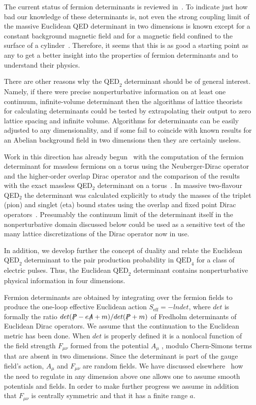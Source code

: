 \documentclass[a4paper,twocolumn,showpacs,preprintnumbers,amsmath,amssymb]{revtex4}
\newcommand{\slashletter}[1]{\ensuremath{\kern+0.1em /\kern-0.65em #1}}
\begin{document}
The current status of fermion determinants is reviewed
in~\cite{Fry02}. To indicate just how bad our knowledge of these
determinants is, not even the strong coupling limit of the massive
Euclidean QED determinant in two dimensions is known except for a
constant background magnetic field and for a magnetic field confined
to the surface of a cylinder~\cite{Fry95}.  Therefore, it seems that
this is as good a starting point as any to get a better insight into
the properties of fermion determinants and to understand their
physics.

There are other reasons why the $\text{QED}_{2}$ determinant should be
of general interest. Namely, if there were precise nonperturbative
information on at least one continuum, infinite-volume determinant
then the algorithms of lattice theorists for calculating determinants
could be tested by extrapolating their output to zero lattice spacing
and infinite volume. Algorithms for determinants can be easily
adjusted to any dimensionality, and if some fail to coincide with
known results for an Abelian background field in two dimensions then
they are certainly useless.

Work in this direction has already begun~\cite{Chiu00} with the
computation of the fermion determinant for massless fermions on a
torus using the Neuberger-Dirac operator and the higher-order overlap
Dirac operator and the comparison of the results with the exact
massless QED$_2$ determinant on a torus~\cite{Sachs92}. In massive
two-flavour QED$_2$ the determinant was calculated explicitly to study
the masses of the triplet (pion) and singlet (eta) bound states
using the overlap and fixed point Dirac
operators~\cite{Hausler01}. Presumably the continuum limit of the
determinant itself in the nonperturbative domain discussed below could
be used as a sensitive test of the many lattice discretizations of the
Dirac operator now in use.


In addition, we develop further the concept of duality and relate the
Euclidean $\text{QED}_{2}$ determinant to the pair production
probability in $\text{QED}_{4}$ for a class of electric pulses. Thus,
the Euclidean $\text{QED}_{2}$ determinant contains nonperturbative
physical information in four dimensions.

Fermion determinants are obtained by integrating over the fermion
fields to produce the one-loop effective Euclidean action
$S_{\text{eff}} = -lndet$, where $det$ is formally the ratio
$det(\slashletter{P} - e\slashletter{A} + m)/det(\slashletter{P} + m)$
of Fredholm determinants of Euclidean Dirac operators. We assume that
the continuation to the Euclidean metric has been done. When $det$ is
properly defined it is a nonlocal function of the field strength
$F_{\mu\nu}$ formed from the potential $A_{\mu}$ , modulo Chern-Simons
terms that are absent in two dimensions. Since the determinant is part
of the gauge field's action, $A_{\mu}$ and $F_{\mu\nu}$ are random
fields. We have discussed elsewhere~\cite{Fry95,Fry92,Fry96} how the
need to regulate in any dimension above one allows one to assume
smooth potentials and fields. In order to make further progress we
assume in addition that $F_{\mu\nu}$ is centrally symmetric and that
it has a finite range $a$.
\end{document}
